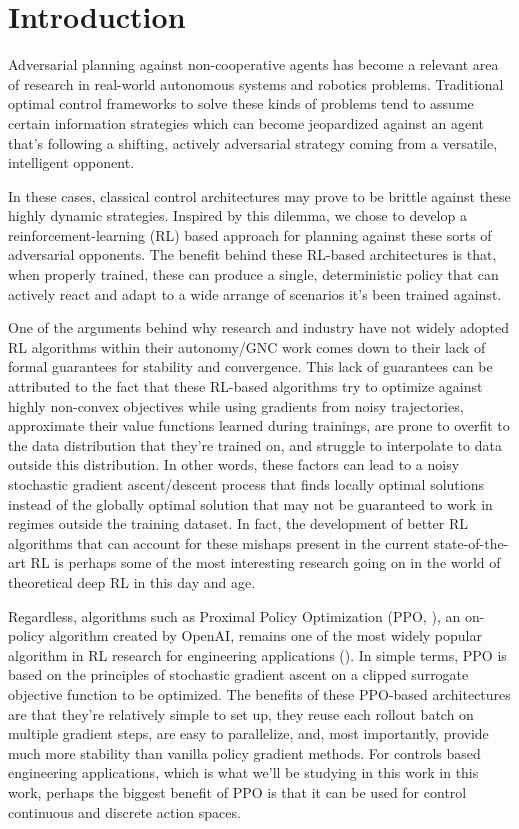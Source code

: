 \chapter{Introduction}


Adversarial planning against non-cooperative agents has become a relevant area of research in real-world autonomous systems and robotics problems. Traditional optimal control frameworks to solve these kinds of problems tend to assume certain information strategies which can become jeopardized against an agent that's following a shifting, actively adversarial strategy coming from a versatile, intelligent opponent. 

In these cases, classical control architectures may prove to be brittle against these highly dynamic strategies. Inspired by this dilemma, we chose to develop a reinforcement-learning (RL) based approach for planning against these sorts of adversarial opponents. The benefit behind these RL-based architectures is that, when properly trained, these can produce a single, deterministic policy that can actively react and adapt to a wide arrange of scenarios it's been trained against. 

One of the arguments behind why research and industry have not widely adopted RL algorithms  within their autonomy/GNC work comes down to their  lack of formal guarantees for stability and convergence. This lack of guarantees can be attributed to the fact that these RL-based algorithms try to optimize against highly non-convex objectives while using gradients from noisy trajectories, approximate their value functions learned during trainings, are prone to overfit to the data distribution that they're trained on, and struggle to interpolate to data outside this distribution. In other words, these factors can lead to a noisy stochastic gradient ascent/descent process that finds locally optimal solutions instead of the globally optimal solution that may not be guaranteed to work in regimes outside the training dataset. In fact, the development of better RL algorithms that can account for these mishaps present in the current state-of-the-art RL is perhaps some of the most interesting research going on in the world of theoretical deep RL in this day and age. 

Regardless, algorithms such as Proximal Policy Optimization (PPO, \cite{schulman2017ppo}), an on-policy algorithm created by OpenAI, remains one of the most widely popular algorithm in RL research for engineering applications (\cite{francois2018introduction}). In simple terms, PPO is based on the principles of stochastic gradient ascent on a clipped surrogate objective function to be optimized. The benefits of these PPO-based architectures are that they're relatively simple to set up, they reuse each rollout batch on multiple gradient steps, are easy to parallelize, and, most importantly, provide much more stability than vanilla policy gradient methods. For controls based engineering applications, which is what we'll be studying in this work in this work, perhaps the biggest benefit of PPO is that it can be used for control continuous and discrete action spaces.



